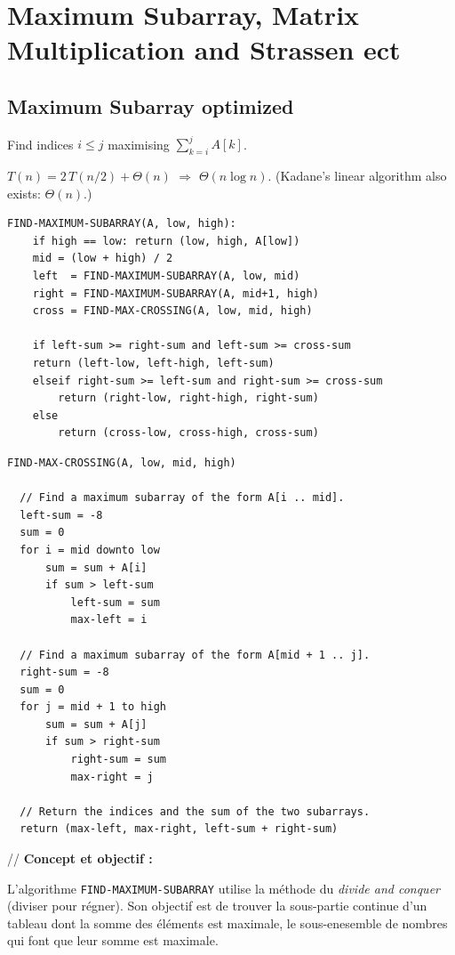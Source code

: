 \documentclass[11pt,a4paper,openany]{book}
\begin{document}
\chapter{Maximum Subarray, Matrix Multiplication and Strassen ect}

\section{Maximum Subarray optimized}

Find indices $i \leq j$ maximising $\sum_{k=i}^{j} A[k]$.

\begin{propbox}[title=Complexity]
$T(n) = 2\,T(n/2) + \Theta(n)$ $\Rightarrow$ $\Theta(n \log n)$.
(Kadane's linear algorithm also exists: $\Theta(n)$.)
\end{propbox}

\begin{lstlisting}
FIND-MAXIMUM-SUBARRAY(A, low, high):
    if high == low: return (low, high, A[low])
    mid = (low + high) / 2
    left  = FIND-MAXIMUM-SUBARRAY(A, low, mid)
    right = FIND-MAXIMUM-SUBARRAY(A, mid+1, high)
    cross = FIND-MAX-CROSSING(A, low, mid, high)

    if left-sum >= right-sum and left-sum >= cross-sum
    return (left-low, left-high, left-sum)
    elseif right-sum >= left-sum and right-sum >= cross-sum
        return (right-low, right-high, right-sum)
    else
        return (cross-low, cross-high, cross-sum)
\end{lstlisting}

\begin{lstlisting}
FIND-MAX-CROSSING(A, low, mid, high)

  // Find a maximum subarray of the form A[i .. mid].
  left-sum = -8
  sum = 0
  for i = mid downto low
      sum = sum + A[i]
      if sum > left-sum
          left-sum = sum
          max-left = i

  // Find a maximum subarray of the form A[mid + 1 .. j].
  right-sum = -8
  sum = 0
  for j = mid + 1 to high
      sum = sum + A[j]
      if sum > right-sum
          right-sum = sum
          max-right = j

  // Return the indices and the sum of the two subarrays.
  return (max-left, max-right, left-sum + right-sum)
\end{lstlisting}
//
\textbf{Concept et objectif :}

L'algorithme \texttt{FIND-MAXIMUM-SUBARRAY} utilise la méthode du \textit{divide and conquer} (diviser pour régner).  
Son objectif est de trouver la sous-partie continue d'un tableau dont la somme des éléments est maximale, le
sous-enesemble de nombres qui font que leur somme est maximale. 
\end{document}
